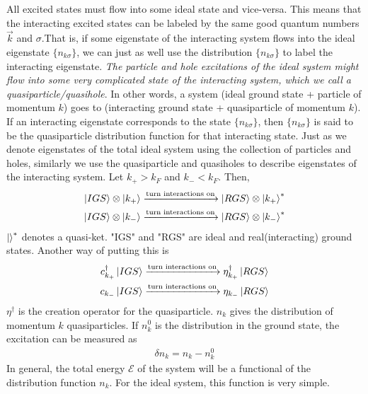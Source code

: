 \documentclass[twoside,11pt]{report}
\numberwithin{equation}{section}
\begin{document}
All excited states must flow into some ideal state and vice-versa.
This means that the interacting excited states can be labeled by the same good quantum numbers \(\vec k\) and \(\sigma\).That is, if some eigenstate of the interacting system flows into the ideal eigenstate \(\{n_{k\sigma}\}\), we can just as well use the distribution \(\{n_{k\sigma}\}\) to label the interacting eigenstate.
\textit{The particle and hole excitations of the ideal system might flow into some very complicated state of the interacting system, which we call a quasiparticle/quasihole}.
In other words, a system (ideal ground state + particle of momentum \(k\)) goes to (interacting ground state + quasiparticle of momentum \(k\)).
If an interacting eigenstate corresponds to the state \(\{n_{k\sigma}\}\), then \(\{n_{k\sigma}\}\) is said to be the quasiparticle distribution function for that interacting state.
Just as we denote eigenstates of the total ideal system using the collection of particles and holes, similarly we use the quasiparticle and quasiholes to describe eigenstates of the interacting system.
Let \(k_+>k_F\) and \(k_- < k_F\).
Then,
\begin{gather}
    \ket{IGS}\otimes\ket{k_+} \xrightarrow{\text{turn interactions on}} \ket{RGS}\otimes\ket{k_+}^* \\
    \ket{IGS}\otimes\ket{k_-} \xrightarrow{\text{turn interactions on}} \ket{RGS}\otimes\ket{k_-}^* \\
\end{gather}
\(\ket{}^*\) denotes a quasi-ket.
"IGS" and "RGS" are ideal and real(interacting) ground states.
Another way of putting this is
\begin{gather}
c^\dagger_{k_+}\ket{IGS} \xrightarrow{\text{turn interactions on}} \eta^\dagger_{k_+}\ket{RGS}\\
c_{k_-}\ket{IGS} \xrightarrow{\text{turn interactions on}} \eta_{k_-}\ket{RGS}
\end{gather}
\(\eta^\dagger\) is the creation operator for the quasiparticle.
\(n_k\) gives the distribution of momentum \(k\) quasiparticles.
If \(n^0_k\) is the distribution in the ground state, the excitation can be measured as 
\begin{equation}\begin{aligned}
\delta n_k = n_k - n^0_k
\end{aligned}\end{equation}
In general, the total energy \(\mathcal{E}\) of the system will be a functional of the distribution function \(n_k\).
For the ideal system, this function is very simple.
\end{document}
